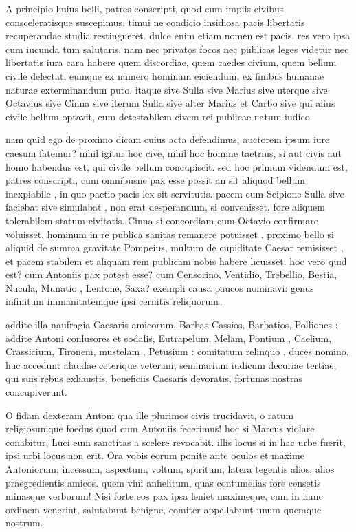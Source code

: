 
 A principio huius belli, patres conscripti, quod cum impiis civibus consceleratisque suscepimus, timui ne condicio insidiosa pacis libertatis recuperandae studia restingueret. dulce enim etiam nomen est pacis, res vero ipsa cum iucunda tum salutaris. nam nec privatos focos nec publicas leges videtur nec libertatis iura cara habere quem discordiae, quem caedes civium, quem bellum civile delectat, eumque ex numero hominum eiciendum, ex finibus humanae naturae exterminandum puto. itaque sive Sulla sive Marius sive uterque sive Octavius sive Cinna sive iterum Sulla sive alter Marius et Carbo sive qui alius civile bellum optavit, eum detestabilem civem rei publicae natum iudico.

 nam quid ego de proximo dicam cuius acta defendimus, auctorem ipsum iure caesum fatemur? nihil igitur hoc cive, nihil hoc homine taetrius, si aut civis aut homo habendus est, qui civile bellum concupiscit. sed hoc primum videndum est, patres conscripti, cum omnibusne pax esse possit an sit aliquod bellum inexpiabile , in quo pactio pacis lex sit servitutis. pacem cum Scipione Sulla sive faciebat sive simulabat , non erat desperandum, si convenisset, fore aliquem tolerabilem statum civitatis. Cinna si concordiam cum Octavio confirmare voluisset, hominum in re publica sanitas remanere potuisset . proximo bello si aliquid de summa gravitate Pompeius, multum de cupiditate Caesar remisisset , et pacem stabilem et aliquam rem publicam nobis habere licuisset. hoc vero quid est? cum Antoniis pax potest esse? cum Censorino, Ventidio, Trebellio, Bestia, Nucula, Munatio , Lentone, Saxa? exempli causa paucos nominavi: genus infinitum immanitatemque ipsi cernitis reliquorum .

 addite illa naufragia Caesaris amicorum, Barbas Cassios, Barbatios, Polliones ; addite Antoni conlusores et sodalis, Eutrapelum, Melam, Pontium , Caelium, Crassicium, Tironem, mustelam , Petusium : comitatum relinquo , duces nomino. huc accedunt alaudae ceterique veterani, seminarium iudicum decuriae tertiae, qui suis rebus exhaustis, beneficiis Caesaris devoratis, fortunas nostras concupiverunt.

 O fidam dexteram Antoni qua ille plurimos civis trucidavit, o ratum religiosumque foedus quod cum Antoniis fecerimus! hoc si Marcus violare conabitur, Luci eum sanctitas a scelere revocabit. illis locus si in hac urbe fuerit, ipsi urbi locus non erit. Ora vobis eorum ponite ante oculos et maxime Antoniorum; incessum, aspectum, voltum, spiritum, latera tegentis alios, alios praegredientis amicos. quem vini anhelitum, quas contumelias fore censetis minasque verborum! Nisi forte eos pax ipsa leniet maximeque, cum in hunc ordinem venerint, salutabunt benigne, comiter appellabunt unum quemque nostrum.

